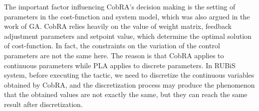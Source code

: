 \documentclass[sigconf]{acmart}
\begin{document}
%
The important factor influencing CobRA's decision making is the setting of parameters in the cost-function and system model, which was also argued in the work of GA. CobRA relies heavily on the value of weight matrix, feedback adjustment parameters and setpoint value, which determine the optimal solution of cost-function.
In fact, the constraints on the variation of the control parameters are not the same here. The reason is that CobRA applies to continuous parameters while PLA applies to discrete parameters.
In RUBiS system, before executing the tactic, we need to discretize the continuous variables obtained by CobRA, and the discretization process may produce the phenomenon that the obtained values are not exactly the same, but they can reach the same result after discretization.
\end{document}
